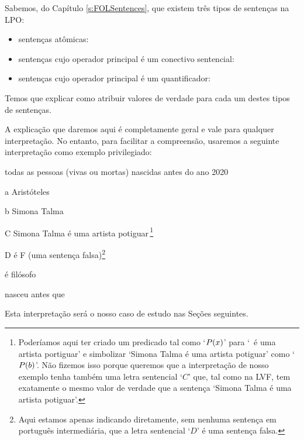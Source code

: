 Sabemos, do Capítulo \ref{s:FOLSentences}, que existem três tipos de sentenças na LPO:
	\begin{itemize}
		\item sentenças atômicas:
		\item sentenças cujo operador principal é um conectivo sentencial:
		\item sentenças cujo operador principal é um quantificador:
	\end{itemize}
Temos que explicar como atribuir valores de verdade para cada um destes tipos de sentenças.

A explicação que daremos aqui é completamente geral e vale para qualquer interpretação.
No entanto, para facilitar a compreensão, usaremos a seguinte interpretação como exemplo privilegiado:
\begin{center}\label{i:Sample}
	\begin{ekey}
		\item[\text{domínio}] {\small todas as pessoas (vivas ou mortas) nascidas antes do ano 2020}
		\item[a] {\small Aristóteles}
		\item[b] {\small Simona Talma}
		\item[C] {\small Simona Talma é uma artista potiguar\,}\footnote{
			Poderíamos aqui ter criado um predicado tal como `$\mathord{P}(x)$' para `~é uma artista portiguar' e simbolizar `Simona Talma é uma artista potiguar' como `$\mathord{P}(b)$'.
			Não fizemos isso porque queremos que a interpretação de nosso exemplo tenha também uma letra sentencial `$C$' que, tal  como na LVF, tem exatamente o mesmo valor de verdade que a sentença `Simona Talma é uma artista potiguar'.}
		\item[D] {\small é F (uma sentença falsa)}\footnote{
			Aqui estamos apenas indicando diretamente, sem nenhuma sentença em português intermediária, que a letra sentencial `$D$' é uma sentença falsa.}
		\item[\atom{F}{x}]  {\small é filósofo}
		\item[\atom{R}{x,y}]  {\small nasceu antes que} 
	\end{ekey}
\end{center}
Esta interpretação será o nosso caso de estudo nas Seções seguintes.


